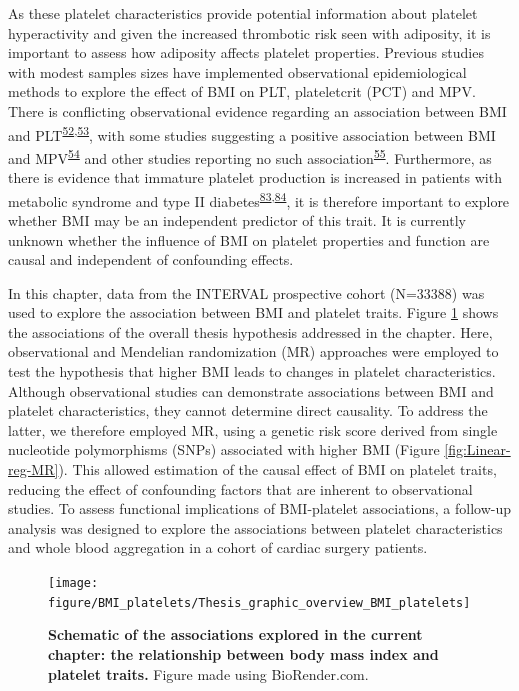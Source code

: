 \documentclass[11pt,twoside]{bristolthesis}
\begin{document}
As these platelet characteristics provide potential information about platelet hyperactivity and given the increased thrombotic risk seen with adiposity, it is important to assess how adiposity affects platelet properties. Previous studies with modest samples sizes have implemented observational epidemiological methods to explore the effect of BMI on PLT, plateletcrit (PCT) and MPV. There is conflicting observational evidence regarding an association between BMI and PLT\textsuperscript{\protect\hyperlink{ref-Furuncuoglu2016}{52},\protect\hyperlink{ref-Han2018a}{53}}, with some studies suggesting a positive association between BMI and MPV\textsuperscript{\protect\hyperlink{ref-Coban2005}{54}} and other studies reporting no such association\textsuperscript{\protect\hyperlink{ref-Heffron2018}{55}}. Furthermore, as there is evidence that immature platelet production is increased in patients with metabolic syndrome and type II diabetes\textsuperscript{\protect\hyperlink{ref-Vaduganathan2008a}{83},\protect\hyperlink{ref-Mijovic2015a}{84}}, it is therefore important to explore whether BMI may be an independent predictor of this trait. It is currently unknown whether the influence of BMI on platelet properties and function are causal and independent of confounding effects.

In this chapter, data from the INTERVAL prospective cohort (N=33388) was used to explore the association between BMI and platelet traits. Figure \ref{fig:BMI-platelet-overview} shows the associations of the overall thesis hypothesis addressed in the chapter. Here, observational and Mendelian randomization (MR) approaches were employed to test the hypothesis that higher BMI leads to changes in platelet characteristics. Although observational studies can demonstrate associations between BMI and platelet characteristics, they cannot determine direct causality. To address the latter, we therefore employed MR, using a genetic risk score derived from single nucleotide polymorphisms (SNPs) associated with higher BMI (Figure \ref{fig:Linear-reg-MR}). This allowed estimation of the causal effect of BMI on platelet traits, reducing the effect of confounding factors that are inherent to observational studies. To assess functional implications of BMI-platelet associations, a follow-up analysis was designed to explore the associations between platelet characteristics and whole blood aggregation in a cohort of cardiac surgery patients.



\begin{figure}
\texttt{[image: figure/BMI\_platelets/Thesis\_graphic\_overview\_BMI\_platelets]} \caption[Schematic of the associations explored in the current chapter: the relationship between body mass index and platelet traits.]{\textbf{Schematic of the associations explored in the current chapter: the relationship between body mass index and platelet traits.} Figure made using BioRender.com.}\label{fig:BMI-platelet-overview}
\end{figure}
\end{document}
